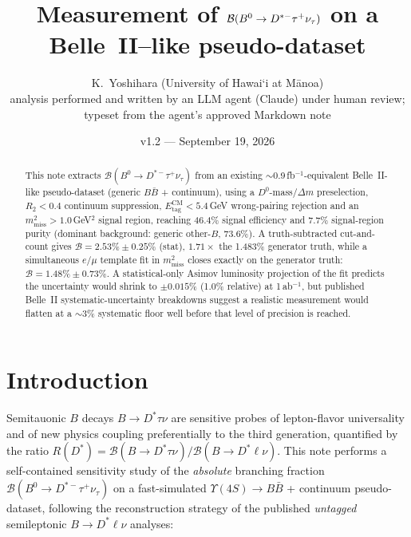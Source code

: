 \documentclass[11pt]{article}
\title{Measurement of $\BF(B^0 \to D^{*-}\tau^{+}\nu_{\tau})$ on a
  Belle~II--like pseudo-dataset}
\author{K.~Yoshihara (University of Hawai\textquoteleft i at M\=anoa)\\[2pt]
  \small analysis performed and written by an LLM agent (Claude) under
  human review;\\ \small typeset from the agent's approved Markdown note}
\date{v1.2 --- September 19, 2026}
\newcommand{\mmiss}{m^2_{\mathrm{miss}}}
\newcommand{\BF}{\mathcal{B}}
\newcommand{\Etag}{E_{\mathrm{tag}}^{\mathrm{CM}}}
\begin{document}
\maketitle

\begin{center}
\end{center}

\begin{abstract}
This note extracts $\BF(B^0\to D^{*-}\tau^{+}\nu_{\tau})$ from an existing
$\sim$0.9\,fb$^{-1}$-equivalent Belle~II-like pseudo-dataset (generic
$B\bar B$ + continuum), using a $D^0$-mass/$\Delta m$ preselection,
$R_2<0.4$ continuum suppression, $\Etag<5.4$\,GeV wrong-pairing rejection
and an $\mmiss>1.0$\,GeV$^2$ signal region, reaching 46.4\% signal
efficiency and 7.7\% signal-region purity (dominant background: generic
other-$B$, 73.6\%). A truth-subtracted cut-and-count gives
$\BF = 2.53\% \pm 0.25\%$ (stat), $1.71\times$ the 1.483\% generator
truth, while a simultaneous $e/\mu$ template fit in $\mmiss$ closes
exactly on the generator truth: $\BF = 1.48\% \pm 0.73\%$. A
statistical-only Asimov luminosity projection of the fit predicts the
uncertainty would shrink to $\pm 0.015\%$ (1.0\% relative) at
1\,ab$^{-1}$, but published Belle~II systematic-uncertainty breakdowns
suggest a realistic measurement would flatten at a $\sim$3\% systematic
floor well before that level of precision is reached.
\end{abstract}

\tableofcontents

\section{Introduction}

Semitauonic $B$ decays $B\to D^{*}\tau\nu$ are sensitive probes of
lepton-flavor universality and of new physics coupling preferentially to
the third generation, quantified by the ratio
$R(D^{*}) = \BF(B\to D^{*}\tau\nu)/\BF(B\to D^{*}\ell\nu)$. This note
performs a self-contained sensitivity study of the \emph{absolute}
branching fraction $\BF(B^0\to D^{*-}\tau^{+}\nu_{\tau})$ on a
fast-simulated $\Upsilon(4S)\to B\bar B$ + continuum pseudo-dataset,
following the reconstruction strategy of the published \emph{untagged}
semileptonic $B\to D^{*}\ell\nu$ analyses:
\end{document}
